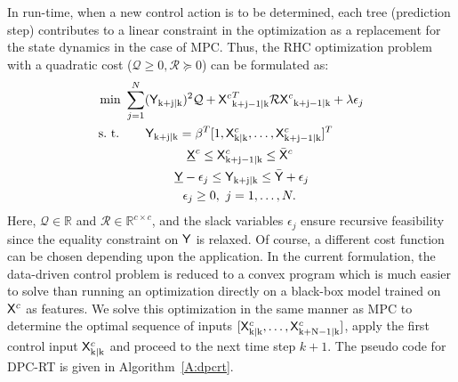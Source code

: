 In run-time, when a new control action is to be determined, each tree (prediction step) contributes to a linear constraint in the optimization as a replacement for the state dynamics in the case of MPC. Thus, the RHC optimization problem with a quadratic cost ($\mathcal{Q} \geq 0, \mathcal{R} \succeq 0$) can be formulated as:
\begin{align}
\begin{aligned}
\text{min } & \sum_{j=1}^{N} ({\mathsf{Y}}_{\mathrm{k+j|k}})^2 \mathcal{Q} + {\mathsf{X}^c}^T_{\mathrm{k+j-1|k}} \mathcal{R} {\mathsf{X}^c}_{\mathrm{k+j-1|k}} +  \lambda\epsilon_j\\
\text{s.~t. } & \ \ \ \ \ \mathsf{Y}_{\mathrm{k+j|k}} =  \beta^T [1,\mathsf{X}^c_{\mathrm{k|k}},\dots,\mathsf{X}^c_{\mathrm{k+j-1|k}} ]^T \\
& \ \ \ \ \ \ \ \ \ \ \ \ \ \ \ \underline{\mathsf{X}}^c \leq \mathsf{X}^c_{\mathrm{k+j-1|k}} \leq \bar{\mathsf{X}}^c\\ 
& \ \ \ \ \ \ \ \ \ \ \ \ \underline{\mathsf{Y}}-\epsilon_j \leq \mathsf{Y}_{\mathrm{k+j|k}} \leq \bar{\mathsf{Y}} + \epsilon_j\\\
& \ \ \ \ \ \ \ \ \ \ \ \ \ \ \epsilon_j \geq 0, \ j = 1,\dots,N.
\end{aligned}
\label{E:dpcrt}
\end{align}
Here, $\mathcal{Q} \in \mathbb{R}$ and $\mathcal{R} \in \mathbb{R}^{c \times c}$, and the slack variables $\epsilon_j$ ensure recursive feasibility since the equality constraint on $\mathsf{Y}$ is relaxed. Of course, a different cost function can be chosen depending upon the application. In the current formulation, the data-driven control problem is reduced to a convex program which is much easier to solve than running an optimization directly on a black-box model trained on $\mathsf{X}^c$ as features. We solve this optimization in the same manner as MPC to determine the optimal sequence of inputs $[\mathsf{X}^c_{\mathrm{k|k}},\dots,\mathsf{X}^c_{\mathrm{k+N-1|k}}]$, apply the first control input $\mathsf{X}^c_{\mathrm{k|k}}$ and proceed to the next time step $k+1$. The pseudo code for DPC-RT is given in Algorithm~\ref{A:dpcrt}.

